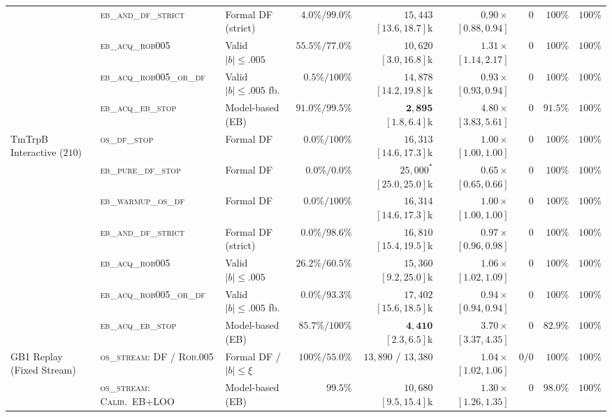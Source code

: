 \documentclass{article}
\theoremstyle{plain}
\theoremstyle{definition}
\begin{document}
\begin{table}[!htbp]
{\begin{tabular}{@{}lllrrrrrr@{}}
 & \textsc{eb\_and\_df\_strict} & Formal DF (strict) & $4.0\%/99.0\%$ & $15{,}443$ $[13.6,18.7]$k & $0.90\times$ $[0.88,0.94]$ & $0$ & $100\%$ & $100\%$ \\
 & \textsc{eb\_acq\_rob005} & Valid $|b|\le.005$ & $55.5\%/77.0\%$ & $10{,}620$ $[3.0,16.8]$k & $1.31\times$ $[1.14,2.17]$ & $0$ & $100\%$ & $100\%$ \\
 & \textsc{eb\_acq\_rob005\_or\_df} & Valid $|b|\le.005$ fb. & $0.5\%/100\%$ & $14{,}878$ $[14.2,19.8]$k & $0.93\times$ $[0.93,0.94]$ & $0$ & $100\%$ & $100\%$ \\
 & \textsc{eb\_acq\_eb\_stop} & Model-based (EB) & $91.0\%/99.5\%$ & $\mathbf{2{,}895}$ $[1.8,6.4]$k & $\mathbf{4.80\times}$ $[3.83,5.61]$ & $0$ & $\mathbf{91.5\%}$ & $100\%$ \\
\midrule
\multirow{7}{*}{TmTrpB Interactive ($210$)}
 & \textsc{os\_df\_stop} & Formal DF & $0.0\%/100\%$ & $16{,}313$ $[14.6,17.3]$k & $1.00\times$ $[1.00,1.00]$ & $0$ & $100\%$ & $100\%$ \\
 & \textsc{eb\_pure\_df\_stop} & Formal DF & $0.0\%/0.0\%$ & $25{,}000^*$ $[25.0,25.0]$k & $0.65\times$ $[0.65,0.66]$ & $0$ & $100\%$ & $100\%$ \\
 & \textsc{eb\_warmup\_os\_df} & Formal DF & $0.0\%/100\%$ & $16{,}314$ $[14.6,17.3]$k & $1.00\times$ $[1.00,1.00]$ & $0$ & $100\%$ & $100\%$ \\
 & \textsc{eb\_and\_df\_strict} & Formal DF (strict) & $0.0\%/98.6\%$ & $16{,}810$ $[15.4,19.5]$k & $0.97\times$ $[0.96,0.98]$ & $0$ & $100\%$ & $100\%$ \\
 & \textsc{eb\_acq\_rob005} & Valid $|b|\le.005$ & $26.2\%/60.5\%$ & $15{,}360$ $[9.2,25.0]$k & $1.06\times$ $[1.02,1.09]$ & $0$ & $100\%$ & $100\%$ \\
 & \textsc{eb\_acq\_rob005\_or\_df} & Valid $|b|\le.005$ fb. & $0.0\%/93.3\%$ & $17{,}402$ $[15.6,18.5]$k & $0.94\times$ $[0.94,0.94]$ & $0$ & $100\%$ & $100\%$ \\
 & \textsc{eb\_acq\_eb\_stop} & Model-based (EB) & $85.7\%/100\%$ & $\mathbf{4{,}410}$ $[2.3,6.5]$k & $\mathbf{3.70\times}$ $[3.37,4.35]$ & $0$ & $\mathbf{82.9\%}$ & $100\%$ \\
\midrule
\multirow{4}{*}{GB1 Replay (Fixed Stream)}
 & \textsc{os\_stream}: DF / \textsc{Rob.005} & Formal DF / $|b|\le\xi$ & $100\% / 55.0\%$ & $13{,}890$ / $13{,}380$ & $1.04\times$ $[1.02,1.06]$ & $0/0$ & $100\%$ & $100\%$ \\
 & \textsc{os\_stream}: \textsc{Calib.\ EB+LOO} & Model-based (EB) & $99.5\%$ & $10{,}680$ $[9.5,15.4]$k & $1.30\times$ $[1.26,1.35]$ & $0$ & $98.0\%$ & $100\%$ \\

\end{tabular}}
\end{table}
\end{document}

